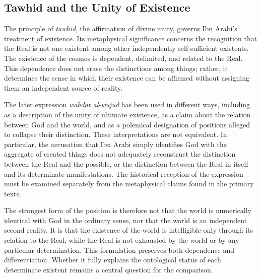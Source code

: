 \subsection{Tawhid and the Unity of Existence}
\label{subsec:ch08_s16_ss04}

\label{para:VS.B01.P01.C08.S16.SS04.P001}

The principle of \textit{tawhid}, the affirmation of divine
unity, governs Ibn Arabi's treatment of existence. Its
metaphysical significance concerns the recognition that
the Real is not one existent among other independently
self-sufficient existents. The existence of the cosmos
is dependent, delimited, and related to the Real. This
dependence does not erase the distinctions among things;
rather, it determines the sense in which their existence
can be affirmed without assigning them an independent
source of reality.

\label{para:VS.B01.P01.C08.SS04.P002}

The later expression \textit{wahdat al-wujud} has been
used in different ways, including as a description of
the unity of ultimate existence, as a claim about the
relation between God and the world, and as a polemical
designation of positions alleged to collapse their
distinction. These interpretations are not equivalent.
In particular, the accusation that Ibn Arabi simply
identifies God with the aggregate of created things
does not adequately reconstruct the distinction between
the Real and the possible, or the distinction between
the Real in itself and its determinate manifestations.
The historical reception of the expression must be
examined separately from the metaphysical claims found
in the primary texts.

\label{para:VS.B01.P01.C08.SS04.P003}

The strongest form of the position is therefore not
that the world is numerically identical with God in
the ordinary sense, nor that the world is an independent
second reality. It is that the existence of the world
is intelligible only through its relation to the Real,
while the Real is not exhausted by the world or by
any particular determination. This formulation preserves
both dependence and differentiation. Whether it fully
explains the ontological status of each determinate
existent remains a central question for the comparison.



